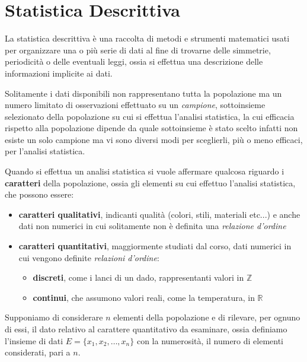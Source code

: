 \documentclass[a4paper,12pt, oneside]{book}
\newcommand{\numberset}{\mathbb}
\newcommand{\Z}{\numberset{Z}}
\newcommand{\R}{\numberset{R}}
\begin{document}
\chapter{Statistica Descrittiva}
La statistica descrittiva è una raccolta di metodi e strumenti matematici usati per organizzare una o più serie di dati
al fine di trovarne delle simmetrie, periodicità o delle eventuali leggi, ossia si effettua una descrizione 
delle informazioni implicite ai dati.

Solitamente i dati disponibili non rappresentano tutta la popolazione ma un numero limitato 
di osservazioni effettuato su un \emph{campione}, sottoinsieme selezionato della popolazione su cui si effettua
l'analisi statistica, la cui efficacia rispetto alla popolazione dipende da quale sottoinsieme è stato scelto
infatti non esiste un solo campione ma vi sono diversi modi per sceglierli, più o meno efficaci, per l'analisi statistica.

Quando si effettua un analisi statistica si vuole affermare qualcosa riguardo i \textbf{caratteri} della popolazione,
ossia gli elementi su cui effettuo l'analisi statistica, che possono essere:
\begin{itemize}
    \item \textbf{caratteri qualitativi}, indicanti qualità (colori, stili, materiali etc...) e anche dati non numerici
             in cui solitamente non è definita una \textit{relazione d'ordine}
    \item \textbf{caratteri quantitativi}, maggiormente studiati dal corso, dati numerici in cui vengono definite \emph{relazioni d'ordine}:
        \begin{itemize}
            \item \textbf{discreti}, come i lanci di un dado, rappresentanti valori in $\Z$
            \item \textbf{continui}, che assumono valori reali, come la temperatura, in $\R$
        \end{itemize}
\end{itemize}
Supponiamo di considerare $n$ elementi della popolazione e di rilevare, per ognuno di essi,
il dato relativo al carattere quantitativo da esaminare, ossia definiamo l'insieme di dati
$E=\{x_1, x_2, \dots, x_n\}$ con la numerosità, il numero di elementi considerati, pari a $n$.
\end{document}
